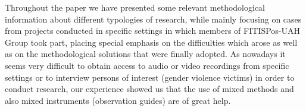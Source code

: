 \documentclass[output=paper]{LSP/langsci}
\begin{document}
Throughout the paper we have presented some relevant methodological information about different typologies of research, while mainly focusing on cases from projects conducted in specific settings in which members of FITISPos-UAH Group took part, placing special emphasis on the difficulties which arose as well as on the methodological solutions that were finally adopted. As nowadays it seems very difficult to obtain access to audio or video recordings from specific settings or to interview persons of interest (gender violence victims) in order to conduct research, our experience showed us that the use of mixed methods and also mixed instruments (observation guides) are of great help.

 
\sloppy
\printbibliography[heading=subbibliography,notkeyword=this]
\end{document}
